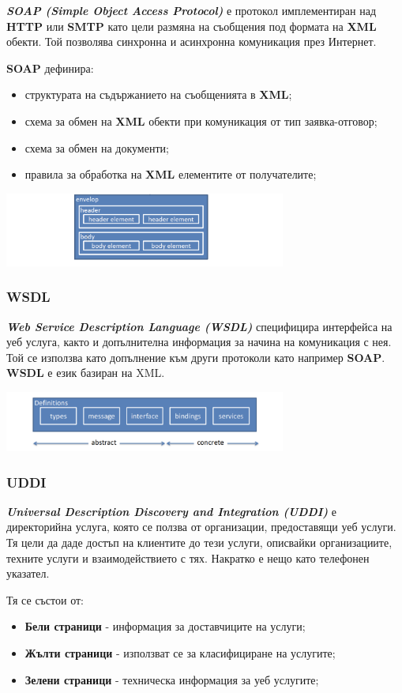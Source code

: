 \documentclass[fleqn,12pt]{article}
\begin{document}
\textbf{\textit{SOAP (Simple Object Access Protocol)}} е протокол имплементиран над \textbf{HTTP} или \textbf{SMTP} като цели размяна на съобщения под формата на \textbf{XML} обекти.
Той позволява синхронна и асинхронна комуникация през Интернет.
\bigbreak

\textbf{SOAP} дефинира:
\begin{itemize}
    \item структурата на съдържанието на съобщенията в \textbf{XML};
    \item схема за обмен на \textbf{XML} обекти при комуникация от тип заявка-отговор;
    \item схема за обмен на документи;
    \item правила за обработка на \textbf{XML} елементите от получателите;
\end{itemize}

\begin{center}\includegraphics[width=350px]{soap.png}\end{center}

\subsubsection{WSDL}

\textbf{\textit{Web Service Description Language (WSDL)}} специфицира интерфейса на уеб услуга, както и допълнителна информация за начина на комуникация с нея.
Той се използва като допълнение към други протоколи като например \textbf{SOAP}.
\textbf{WSDL} е език базиран на XML.

\begin{center}\includegraphics[width=350px]{wsdl.png}\end{center}

\subsubsection{UDDI}

\textbf{\textit{Universal Description Discovery and Integration (UDDI)}} е директорийна услуга, която се ползва от организации, предоставящи уеб услуги.
Тя цели да даде достъп на клиентите до тези услуги, описвайки организациите, техните услуги и взаимодействието с тях.
Накратко е нещо като телефонен указател.
\bigbreak

Тя се състои от:
\begin{itemize}
    \item \textbf{Бели страници} - информация за доставчиците на услуги;
    \item \textbf{Жълти страници} - използват се за класифициране на услугите;
    \item \textbf{Зелени страници} - техническа информация за уеб услугите;
\end{itemize}
\end{document}
